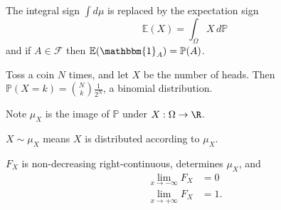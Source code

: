 \documentclass{article}
\newcommand{\1}[1]{\mathbbm{1}_{#1}}
\newcommand{\Prob}{\mathbb{P}}
\newcommand{\E}{\mathbb{E}}
\begin{document}

\begin{notation}
    The integral sign $\int d\mu$ is replaced by the expectation sign
    \begin{equation*}
        \mathbb{E}(X) = \int_\Omega X \, d \Prob
    \end{equation*}
    and if $A \in \mathcal{F}$ then $\E(\1{A}) = \Prob(A)$.
\end{notation}

\begin{eg}
    Toss a coin $N$ times, and let $X$ be the number of heads. Then $\Prob(X = k) = \binom{N}{k} \frac{1}{2^N}$, a binomial distribution.
\end{eg}

Note $\mu_X$ is the image of $\Prob$ under $X: \Omega \to \R$.

\begin{notation}
    $X \sim \mu_X$ means $X$ is distributed according to $\mu_X$.
\end{notation}

\begin{defi}[Cumulative probability function]\hypertarget{def:cdf}
    The function $F_X = \Prob(X \leq x) = \mu_X(-\infty, x]$ is the \textbf{cumulative probability function}.%
\end{defi}

\begin{remark}
    $F_X$ is non-decreasing right-continuous, determines $\mu_X$, and
    \begin{equation*} \tag{$*$} \label{eq:cumLimits}
        \begin{aligned}
            \lim_{x \to -\infty} F_X &= 0 \\
            \lim_{x \to +\infty} F_X &= 1.
        \end{aligned}
    \end{equation*}
\end{remark}
\end{document}
